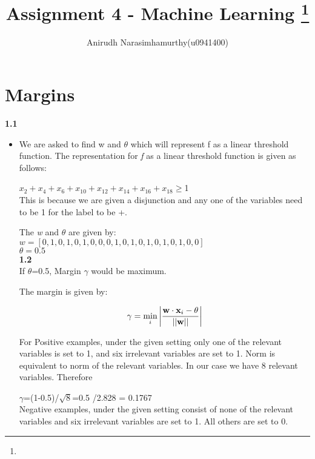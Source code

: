 \documentclass[11pt]{article}
\title{Assignment 4 - Machine Learning
\footnote{\s{CS 6350 ; \;\; Spring 2015 \hfill}
}
}
\author{Anirudh Narasimhamurthy(u0941400)}
\newcommand{\bw}{{\bf w}}
\newcommand{\bx}{{\bf x}}
\begin{document}
\maketitle

\lstset{language=python} 


\section{Margins}
\textbf{1.1}
\begin{itemize}
	\item[] We are asked to find w and $\theta$ which will represent f as a linear threshold function. The representation for \emph f as a linear threshold function is given as follows:

$x_2+x_4+x_6+x_{10}+x_{12}+x_{14}+x_{16}+x_{18} \geq$1\\

This is because we are given a disjunction and any one of the variables need to be 1 for the label to be +.

The \emph{w} and $\theta$ are given by:\\

$w=[0,1,0,1,0,1,0,0,0,1,0,1,0,1,0,1,0,1,0,0]$\\
$\theta=0.5$\\



\textbf{1.2}\\

If $\theta$=0.5, Margin $\gamma$ would be maximum. 

The margin is given by: 

$$\gamma = \min_i \left| \frac{\bw \cdot \bx_i - \theta}{||\bw||} \right|$$

For Positive examples, under the given setting only one of the relevant variables is set to 1, and six irrelevant variables are set to 1. Norm is equivalent to norm of the relevant variables. In our case we have 8 relevant variables. Therefore

 $\gamma$=(1-0.5)/$\sqrt{8}$=0.5 /2.828 = 0.1767\\

Negative examples, under the given setting consist of none of the relevant variables and six irrelevant variables are set to 1. All others are set to 0.


\end{itemize}
\end{document}
